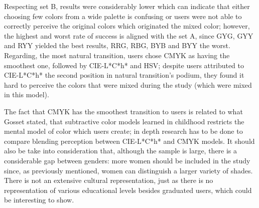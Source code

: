 Respecting set B, results were considerably lower which can indicate that either choosing few colors from
a wide palette is confusing or users were not able to correctly perceive the original colors which originated
the mixed color; however, the highest and worst rate of success is aligned with the set A, since GYG, GYY
and RYY yielded the best results, RRG, RBG, BYB and BYY the worst. Regarding, the most natural transition,
users chose CMYK as having the smoothest one, followed by CIE-L*C*h* and HSV; despite users attributed to
CIE-L*C*h* the second position in natural transition’s podium, they found it hard to perceive the colors
that were mixed during the study (which were mixed in this model). \par
%
The fact that CMYK has the smoothest transition to users is related to what Gosset \cite{Gossett2004} stated, that
subtractive color models learned in childhood restricts the mental model of color which users create;
in depth research has to be done to compare blending perception between CIE-L*C*h* and CMYK models. It
should also be take into consideration that, although the sample is large, there is a considerable gap
between genders: more women should be included in the study since, as previously mentioned, women can
distinguish a larger variety of shades. There is not an extensive cultural representation, just as there
is no representation of various educational levels besides graduated users, which could be interesting to show. \par
%
